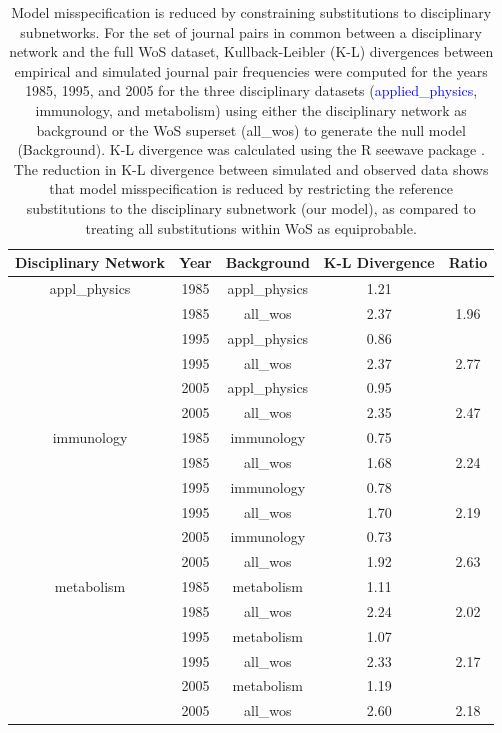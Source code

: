 \documentclass[NETN]{stjour}
\begin{document}
\begin{table}[ht]
\caption{Model misspecification is reduced by constraining substitutions to disciplinary subnetworks. For the set of journal pairs in common between a disciplinary network and the full WoS dataset, Kullback-Leibler (K-L) divergences
between empirical and simulated journal pair frequencies were computed for the years 1985, 1995, and 2005 for the three disciplinary datasets (\textcolor{blue}{applied\_physics}, immunology, and metabolism) using either the disciplinary network as background or the WoS superset (all\_wos) to generate the null model (Background). K-L divergence was calculated using the R seewave package \citep{seewave2008}.  The reduction in K-L divergence between simulated and observed data  shows that model misspecification is reduced by  restricting the reference substitutions to the disciplinary subnetwork (our model), as compared to treating all substitutions within WoS as equiprobable.
}
\label{tab:kld}
\centering
\begin{tabular}{| ccccc |} 
  \hline
 Disciplinary Network & Year & Background & K-L Divergence & Ratio \\ 
  \hline
 appl\_physics & 1985 & appl\_physics & 1.21 &  \\ 
  & 1985 & all\_wos & 2.37 & 1.96 \\ 
  & 1995 & appl\_physics & 0.86 &  \\ 
  & 1995 & all\_wos & 2.37 & 2.77 \\ 
  & 2005 & appl\_physics & 0.95 &  \\ 
  & 2005 & all\_wos & 2.35 & 2.47 \\ 
    \hline
  immunology & 1985 & immunology & 0.75 &  \\ 
  & 1985 & all\_wos & 1.68 & 2.24 \\ 
   & 1995 & immunology & 0.78 &  \\ 
   & 1995 & all\_wos & 1.70 & 2.19 \\ 
   & 2005 & immunology & 0.73 &  \\ 
  & 2005 & all\_wos & 1.92 & 2.63 \\ 
    \hline
 metabolism & 1985 & metabolism & 1.11 &  \\ 
   & 1985 & all\_wos & 2.24 & 2.02 \\ 
  & 1995 & metabolism & 1.07 &  \\ 
  & 1995 & all\_wos & 2.33 & 2.17 \\ 
     & 2005 & metabolism & 1.19 &  \\ 
   & 2005 & all\_wos & 2.60 & 2.18 \\ 
   \hline
\end{tabular}
\end{table}
\end{document}
